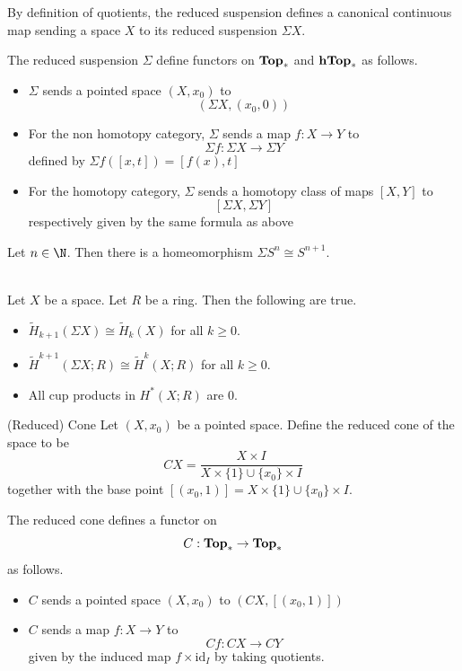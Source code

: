 \documentclass[a4paper]{article}
\begin{document}
By definition of quotients, the reduced suspension defines a canonical continuous map sending a space $X$ to its reduced suspension $\Sigma X$. 

\begin{prp}{}{} The reduced suspension $\Sigma$ define functors on $\bold{Top}_\ast$ and $\bold{hTop}_\ast$ as follows. 
\begin{itemize}
\item $\Sigma$ sends a pointed space $(X,x_0)$ to $$(\Sigma X,(x_0,0))$$
\item For the non homotopy category, $\Sigma$ sends a map $f:X\to Y$ to $$\Sigma f:\Sigma X\to\Sigma Y$$ defined by $\Sigma f([x,t])=[f(x),t]$
\item For the homotopy category, $\Sigma$ sends a homotopy class of maps $[X,Y]$ to $$[\Sigma X,\Sigma Y]$$ respectively given by the same formula as above
\end{itemize}
\end{prp}

\begin{eg}{}{} Let $n\in\N$. Then there is a homeomorphism $\Sigma S^n\cong S^{n+1}$. 
\end{eg}

\begin{prp}{}{}\\
Let $X$ be a space. Let $R$ be a ring. Then the following are true. 
\begin{itemize}
\item $\widetilde{H}_{k+1}(\Sigma X)\cong\widetilde{H}_k(X)$ for all $k\geq 0$. 
\item $\widetilde{H}^{k+1}(\Sigma X;R)\cong\widetilde{H}^k(X;R)$ for all $k\geq 0$. 
\item All cup products in $H^\ast(X;R)$ are $0$. 
\end{itemize}
\end{prp}

\begin{defn}{(Reduced) Cone}{} Let $(X,x_0)$ be a pointed space. Define the reduced cone of the space to be $$CX=\frac{X\times I}{X\times\{1\}\cup\{x_0\}\times I}$$ together with the base point $[(x_0,1)]=X\times\{1\}\cup\{x_0\}\times I$. 
\end{defn}

\begin{prp}{}{} The reduced cone defines a functor on $$C:\bold{Top}_\ast\to\bold{Top}_\ast$$ as follows. 
\begin{itemize}
\item $C$ sends a pointed space $(X,x_0)$ to $(CX,[(x_0,1)])$
\item $C$ sends a map $f:X\to Y$ to $$Cf:CX\to CY$$ given by the induced map $f\times\text{id}_I$ by taking quotients. 
\end{itemize}
\end{prp}
\end{document}
